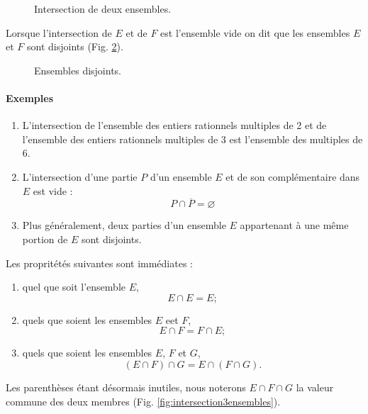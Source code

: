 \documentclass[12pt,parskip=full,chapterprefix=true,a5paper]{scrbook}
\begin{document}
\begin{figure}[ht]
  \centering
  \caption{\label{fig:intersection}Intersection de deux ensembles.}
\end{figure}

Lorsque l'intersection de \(E\) et de \(F\) est l'ensemble vide on dit que les ensembles \(E\) et \(F\) sont disjoints (Fig. \ref{fig:disjoints}).

\begin{figure}[ht]
  \centering
  \caption{\label{fig:disjoints}Ensembles disjoints.}
\end{figure}

\clearpage

\paragraph{Exemples}
\begin{enumerate}
\item L'intersection de l'ensemble des entiers rationnels multiples de 2 et de l'ensemble des entiers rationnels multiples de 3 est l'ensemble des multiples de 6.
\item L'intersection d'une partie \(P\) d'un ensemble \(E\) et de son complémentaire dans \(E\) est vide :
  \[
    P\cap\overline{P}=\varnothing
  \]
\item Plus généralement, deux parties d'un ensemble \(E\) appartenant à une même portion de \(E\) sont disjoints.
\end{enumerate}

Les propritétés suivantes sont immédiates :
\begin{enumerate} [label=\alph*)]
\item quel que soit l'ensemble \(E\),
  \[E\cap E=E;\]
\item quels que soient les ensembles \(E\) eet \(F\),
  \[E\cap F=F\cap E;\]
\item quels que soient les ensembles \(E\), \(F\) et \(G\),
  \[(E\cap F)\cap G=E\cap(F\cap G).\]
\end{enumerate}
Les parenthèses étant désormais inutiles, nous noterons \(E\cap F\cap G\) la valeur commune des deux membres (Fig. \ref{fig:intersection3ensembles}).
\end{document}
